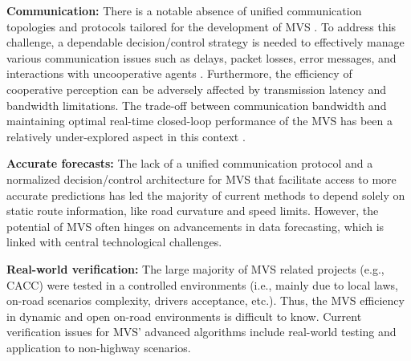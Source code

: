 \textbf{Communication:} There is a notable absence of unified communication topologies and protocols tailored for the development of MVS \cite{hafner2021survey}. To address this challenge, a dependable decision/control strategy is needed to effectively manage various communication issues such as delays, packet losses, error messages, and interactions with uncooperative agents \cite{cui2019review}\cite{sun2021survey}. Furthermore, the efficiency of cooperative perception can be adversely affected by transmission latency and bandwidth limitations. The trade-off between communication bandwidth and maintaining optimal real-time closed-loop performance of the MVS has been a relatively under-explored aspect in this context \cite{ahmed2023vehicular}\cite{sarker2019review}\cite{daoud2023communication}.




\textbf{Accurate forecasts:} The lack of a unified communication protocol and a normalized decision/control architecture for MVS that facilitate access to more accurate predictions has led the majority of current methods to depend solely on static route information, like road curvature and speed limits. However, the potential of MVS often hinges on advancements in data forecasting, which is linked with central technological challenges. 

\textbf{Real-world verification:} The large majority of MVS related projects (e.g., CACC) were tested in a controlled environments (i.e., mainly due to local laws, on-road scenarios complexity, drivers acceptance, etc.)\cite{arvin2020safety}\cite{damaj2021connected}\cite{duboz2022exploring}. Thus, the MVS efficiency in dynamic and open on-road environments is difficult to know. Current verification issues for MVS' advanced algorithms include real-world testing and application to non-highway scenarios. 
 



